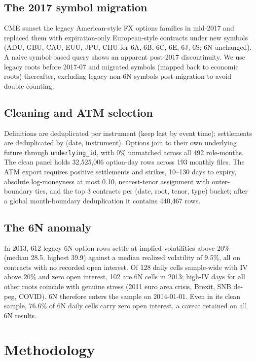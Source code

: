 \documentclass[10pt,twocolumn]{article}
\begin{document}
\subsection{The 2017 symbol migration}
CME sunset the legacy American-style FX options families in mid-2017 and replaced them with expiration-only European-style contracts under new symbols (ADU, GBU, CAU, EUU, JPU, CHU for 6A, 6B, 6C, 6E, 6J, 6S; 6N unchanged). A naive symbol-based query shows an apparent post-2017 discontinuity. We use legacy roots before 2017-07 and migrated symbols (mapped back to economic roots) thereafter, excluding legacy non-6N symbols post-migration to avoid double counting.

\subsection{Cleaning and ATM selection}
Definitions are deduplicated per instrument (keep last by event time); settlements are deduplicated by (date, instrument). Options join to their own underlying future through \texttt{underlying\_id}, with 0\% unmatched across all 492 role-months. The clean panel holds 32{,}525{,}006 option-day rows across 193 monthly files. The ATM export requires positive settlements and strikes, 10--130 days to expiry, absolute log-moneyness at most 0.10, nearest-tenor assignment with outer-boundary ties, and the top 3 contracts per (date, root, tenor, type) bucket; after a global month-boundary deduplication it contains 440{,}467 rows.

\subsection{The 6N anomaly}
\label{sec:6n}
In 2013, 612 legacy 6N option rows settle at implied volatilities above 20\% (median 28.5, highest 39.9) against a median realized volatility of 9.5\%, all on contracts with no recorded open interest. Of 128 daily cells sample-wide with IV above 20\% and zero open interest, 102 are 6N cells in 2013; high-IV days for all other roots coincide with genuine stress (2011 euro area crisis, Brexit, SNB de-peg, COVID). 6N therefore enters the sample on 2014-01-01. Even in its clean sample, 76.6\% of 6N daily cells carry zero open interest, a caveat retained on all 6N results.

\section{Methodology}
\end{document}

